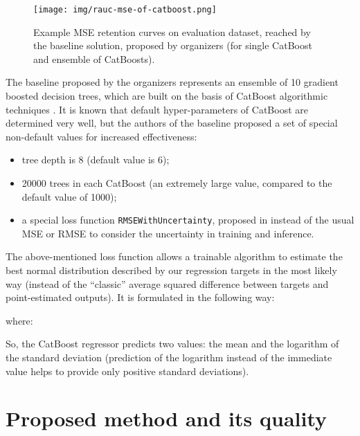 \documentclass{article}
\begin{document}
\begin{figure*}[hbt!]
 \centering
\begin{minipage}[h]{0.8\linewidth}
  \centering
  \centerline{\texttt{[image: img/rauc-mse-of-catboost.png]}}
  \vspace{-0.1cm}
\end{minipage}
 \caption{Example MSE retention curves on evaluation dataset, reached by the baseline solution, proposed by organizers (for single CatBoost and ensemble of CatBoosts). \cite{Malinin2021shifts}}
 \label{fig:rauc-mse-example}
\end{figure*}

The baseline proposed by the organizers represents an ensemble of 10 gradient boosted decision trees, which are built on the basis of CatBoost algorithmic techniques \cite{Ostroumova2018catboost}. It is known that default hyper-parameters of CatBoost are determined very well, but the authors of the baseline proposed a set of special non-default values for increased effectiveness:

\begin{itemize}
  \item tree depth is 8 (default value is 6);
  \item 20000 trees in each CatBoost (an extremely large value, compared to the default value of 1000);
  \item a special loss function \verb+RMSEWithUncertainty+, proposed in \cite{Malinin2021gbtuncertainty} instead of the usual MSE or RMSE to consider the uncertainty in training and inference.
\end{itemize}

The above-mentioned loss function allows a trainable algorithm to estimate the best normal distribution described by our regression targets in the most likely way (instead of the “classic” average squared difference between targets and point-estimated outputs). It is formulated in the following way:



where:



So, the CatBoost regressor  predicts two values: the mean  and the logarithm of the standard deviation  (prediction of the logarithm instead of the immediate value helps to provide only positive standard deviations).

\section{Proposed method and its quality}
\label{snn}
\end{document}
